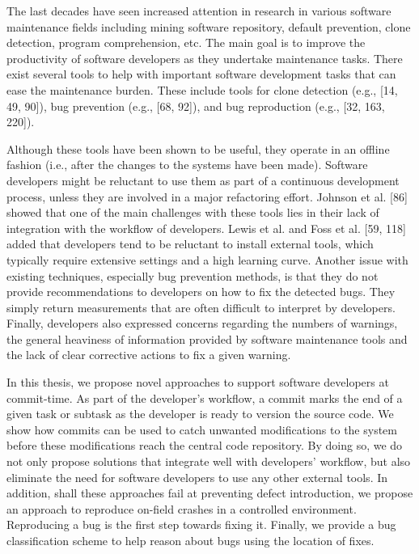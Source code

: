 \documentclass[12pt]{report}
\begin{document}
The last decades have seen increased attention in research in various
software maintenance fields including mining software repository,
default prevention, clone detection, program comprehension, etc. The
main goal is to improve the productivity of software developers as they
undertake maintenance tasks. There exist several tools to help with
important software development tasks that can ease the maintenance
burden. These include tools for clone detection (e.g., {[}14, 49,
90{]}), bug prevention (e.g., {[}68, 92{]}), and bug reproduction (e.g.,
{[}32, 163, 220{]}).

Although these tools have been shown to be useful, they operate in an
offline fashion (i.e., after the changes to the systems have been made).
Software developers might be reluctant to use them as part of a
continuous development process, unless they are involved in a major
refactoring effort. Johnson et al. {[}86{]} showed that one of the main
challenges with these tools lies in their lack of integration with the
workflow of developers. Lewis et al. and Foss et al. {[}59, 118{]} added
that developers tend to be reluctant to install external tools, which
typically require extensive settings and a high learning curve. Another
issue with existing techniques, especially bug prevention methods, is
that they do not provide recommendations to developers on how to fix the
detected bugs. They simply return measurements that are often difficult
to interpret by developers. Finally, developers also expressed concerns
regarding the numbers of warnings, the general heaviness of information
provided by software maintenance tools and the lack of clear corrective
actions to fix a given warning.

In this thesis, we propose novel approaches to support software
developers at commit-time. As part of the developer's workflow, a commit
marks the end of a given task or subtask as the developer is ready to
version the source code. We show how commits can be used to catch
unwanted modifications to the system before these modifications reach
the central code repository. By doing so, we do not only propose
solutions that integrate well with developers' workflow, but also
eliminate the need for software developers to use any other external
tools. In addition, shall these approaches fail at preventing defect
introduction, we propose an approach to reproduce on-field crashes in a
controlled environment. Reproducing a bug is the first step towards
fixing it. Finally, we provide a bug classification scheme to help
reason about bugs using the location of fixes.
\end{document}
